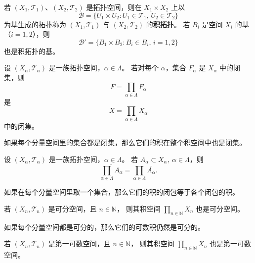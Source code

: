 \begin{definition}[积拓扑的基]
若 \((X_1,\mathcal{T}_1)\)、\((X_2,\mathcal{T}_2)\) 是拓扑空间，则在 \(X_1\times X_2\) 上以
\[
\mathcal{B} = \{U_1 \times U_2 : U_1 \in \mathcal{T}_1,\, U_2 \in \mathcal{T}_2\}
\]
为基生成的拓扑称为 \((X_1,\mathcal{T}_1)\) 与 \((X_2,\mathcal{T}_2)\) 的\textbf{积拓扑}。  
若 \(B_i\) 是空间 \(X_i\) 的基（\(i=1,2\)），则
\[
\mathcal{B}' = \{B_1 \times B_2 : B_i \in B_i,\, i=1,2\}
\]
也是积拓扑的基。
\end{definition}
\begin{theorem}[积空间中闭集的积仍为闭集]\label{thm:product-closed}
设 \((X_\alpha, \mathcal{T}_\alpha)\) 是一族拓扑空间，\(\alpha \in \Lambda\)。  
若对每个 \(\alpha\)，集合 \(F_\alpha\) 是 \(X_\alpha\) 中的闭集，则
\[
F = \prod_{\alpha \in \Lambda} F_\alpha
\]
是
\[
X = \prod_{\alpha \in \Lambda} X_\alpha
\]
中的闭集。
\end{theorem}

\begin{note}
如果每个分量空间里的集合都是闭集，那么它们的积在整个积空间中也是闭集。
\end{note}
\begin{theorem}[积空间中积集的闭包]\label{thm:product-closure}
设 \((X_\alpha, \mathcal{T}_\alpha)\) 是一族拓扑空间，\(\alpha \in \Lambda\)。  
若 \(A_\alpha \subset X_\alpha,\ \alpha \in \Lambda\)，则
\[
\overline{\prod_{\alpha \in \Lambda} A_\alpha}
= \prod_{\alpha \in \Lambda} \overline{A_\alpha}.
\]
\end{theorem}

\begin{note}
如果在每个分量空间里取一个集合，那么它们的积的闭包等于各个闭包的积。
\end{note}
\begin{theorem}[可分空间的可数积仍可分]\label{thm:countable-product-separable}
若 \((X_n, \mathcal{T}_n)\) 是可分空间，且 \(n \in \mathbb{N}\)，  
则其积空间 \(\displaystyle \prod_{n \in \mathbb{N}} X_n\) 也是可分空间。
\end{theorem}

\begin{note}
如果每个分量空间都是可分的，那么它们的可数积仍然是可分的。
\end{note}
\begin{theorem}[第一可数空间的可数积仍第一可数]\label{thm:countable-product-first-countable}
若 \((X_n, \mathcal{T}_n)\) 是第一可数空间，且 \(n \in \mathbb{N}\)，  
则其积空间 \(\displaystyle \prod_{n \in \mathbb{N}} X_n\) 也是第一可数空间。
\end{theorem}

